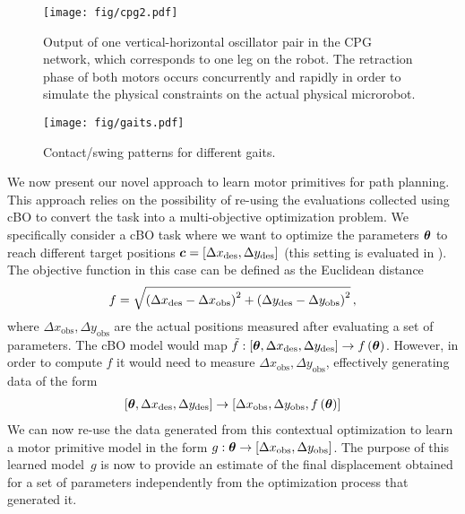 %
\begin{figure}[t]
	\centering
	\texttt{[image: fig/cpg2.pdf]}
	\caption{Output of one vertical-horizontal oscillator pair in the CPG network, which corresponds to one leg on the robot. 
	The retraction phase of both motors occurs concurrently and rapidly in order to simulate the physical constraints on the actual physical microrobot.}
	\label{fig:cpg}
\end{figure}
% 
%
\begin{figure}[t]
	\centering
	\texttt{[image: fig/gaits.pdf]}
	\caption{Contact/swing patterns for different gaits.}
	\label{fig:gaits}
	\vspace{-8pt}
\end{figure}
%

We now present our novel approach to learn motor primitives for path planning.
This approach relies on the possibility of re-using the evaluations collected using cBO to convert the task into a multi-objective optimization problem.
We specifically consider a cBO task where we want to optimize the parameters $\boldsymbol{\theta}$ to reach different target positions $\boldsymbol{c}=\left[ \Delta x_\text{des}, \Delta y_\text{des} \right]$ (this setting is evaluated in ).
The objective function in this case can be defined as the Euclidean distance 
%
\begin{align}
	f = \sqrt{\left(\Delta x_\text{des} -\Delta x_\text{obs}\right)^{2} + \left(\Delta y_\text{des} -\Delta y_\text{obs}\right)^{2}}\,,
\end{align}
%
where $\Delta x_\text{obs}, \Delta y_\text{obs}$ are the actual positions measured after evaluating a set of parameters.
The cBO model would map $\tilde{f}: \left[\boldsymbol{\theta}, \Delta x_\text{des}, \Delta y_\text{des}\right] \rightarrow f\left(\boldsymbol{\theta}\right)$. 
However, in order to compute $f$ it would need to measure $\Delta x_\text{obs}, \Delta y_\text{obs}$, effectively generating data of the form
%
\begin{align}
	\left[\boldsymbol{\theta}, \Delta x_\text{des}, \Delta y_\text{des}\right] \rightarrow \left[\Delta x_\text{obs}, \Delta y_\text{obs}, f\left(\boldsymbol{\theta}\right)\right]
\end{align}
%
We can now re-use the data generated from this contextual optimization to learn a motor primitive model in the form $g: \boldsymbol{\theta} \rightarrow \left[\Delta x_\text{obs}, \Delta y_\text{obs}\right]$.
The purpose of this learned model~$g$ is now to provide an estimate of the final displacement obtained for a set of parameters independently from the optimization process that generated it.
